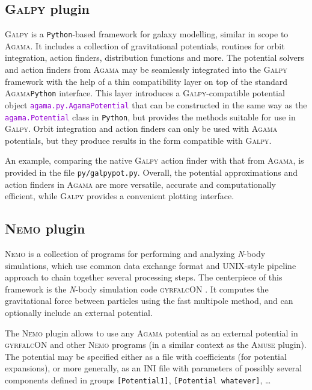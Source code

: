 \documentclass[12pt]{article}
\newcommand{\Agama}{\textsc{Agama}\xspace}
\newcommand{\Amuse}{\textsc{Amuse}\xspace}
\newcommand{\Galpy}{\textsc{Galpy}\xspace}
\newcommand{\Nemo} {\textsc{Nemo}\xspace}
\newcommand{\Nbody}{\textsl{N}-body\xspace}
\newcommand{\Python}{\texttt{Python}\xspace}
\newcommand{\ttt}[1]{\textcolor{darkviolet}{\texttt{#1}}}
\newcommand{\ppp}[1]{\textcolor{darkolive} {\texttt{#1}}}
\begin{document}
\subsection{\Galpy plugin}  \label{sec:Galpy}

\Galpy \cite{Bovy2015} is a \Python-based framework for galaxy modelling, similar in scope to \Agama. It includes a collection of gravitational potentials, routines for orbit integration, action finders, distribution functions and more. 
The potential solvers and action finders from \Agama may be seamlessly integrated into the \Galpy framework with the help of a thin compatibility layer on top of the standard \Agama \Python interface. This layer introduces a \Galpy-compatible potential object \ttt{agama.py.AgamaPotential} that can be constructed in the same way as the \ttt{agama.Potential} class in \Python, but provides the methods suitable for use in \Galpy. Orbit integration and action finders can only be used with \Agama potentials, but they produce results in the form compatible with \Galpy. 

An example, comparing the native \Galpy action finder with that from \Agama, is provided in the file \texttt{py/galpypot.py}. Overall, the potential approximations and action finders in \Agama are more versatile, accurate and computationally efficient, while \Galpy provides a convenient plotting interface.

\subsection{\Nemo plugin}  \label{sec:Nemo}

\Nemo \cite{Teuben1995} is a collection of programs for performing and analyzing \Nbody simulations, which use common data exchange format and UNIX-style pipeline approach to chain together several processing steps. The centerpiece of this framework is the \Nbody simulation code \textsc{gyrfalcON} \cite{Dehnen2000}. It computes the gravitational force between particles using the fast multipole method, and can optionally include an external potential.

The \Nemo plugin allows to use any \Agama potential as an external potential in \textsc{gyrfalcON} and other \Nemo programs (in a similar context as the \Amuse plugin). The potential may be specified either as a file with coefficients (for potential expansions), or more generally, as an INI file with parameters of possibly several components defined in groups \ppp{[Potential1]}, \ppp{[Potential whatever]}, \dots
\end{document}
